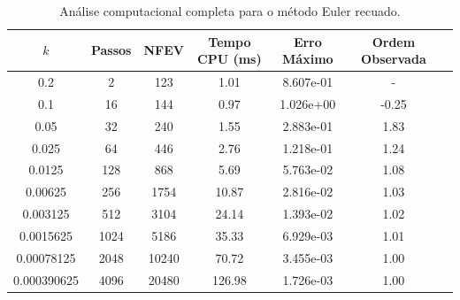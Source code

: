 \begin{table}[H]
    \centering
    \begin{tabular}{ccccccc}
        \hline
        $k$ & Passos & NFEV & Tempo CPU (ms) & Erro Máximo & Ordem Observada \\
        \hline
        0.2 & 2 & 123 & 1.01  & 8.607e-01 & - \\
        0.1 & 16 & 144 & 0.97  & 1.026e+00 & -0.25 \\
        0.05 & 32 & 240 & 1.55  & 2.883e-01 & 1.83 \\
        0.025 & 64 & 446 & 2.76  & 1.218e-01 & 1.24 \\
        0.0125 & 128 & 868 & 5.69  & 5.763e-02 & 1.08 \\
        0.00625 & 256 & 1754 & 10.87  & 2.816e-02 & 1.03 \\
        0.003125 & 512 & 3104 & 24.14  & 1.393e-02 & 1.02 \\
        0.0015625 & 1024 & 5186 & 35.33  & 6.929e-03 & 1.01 \\
        0.00078125 & 2048 & 10240 & 70.72  & 3.455e-03 & 1.00 \\
        0.000390625 & 4096 & 20480 & 126.98  & 1.726e-03 & 1.00 \\
        \hline
    \end{tabular}
    \caption{Análise computacional completa para o método Euler recuado.}
    \label{tab:erros_euler_recuado}
\end{table}
